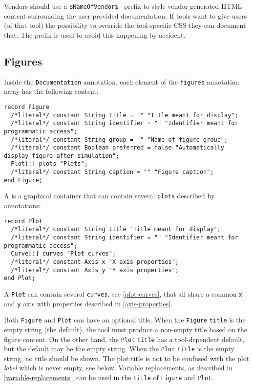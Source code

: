 Vendors should use a \lstinline[language=CSS]!$NameOfVendor$-! prefix to style vendor generated HTML content surrounding the user provided documentation.
If tools want to give users (of that tool) the possibility to override the tool-specific CSS they can document that.
The prefix is used to avoid this happening by accident.

\subsection{Figures}\label{annotations-for-figures}\label{figures}

Inside the \lstinline!Documentation! annotation, each element of the \lstinline!figures! annotation array has the following content:
\begin{lstlisting}[language=modelica]
record Figure
  /*literal*/ constant String title = "" "Title meant for display";
  /*literal*/ constant String identifier = "" "Identifier meant for programmatic access";
  /*literal*/ constant String group = "" "Name of figure group";
  /*literal*/ constant Boolean preferred = false "Automatically display figure after simulation";
  Plot[:] plots "Plots";
  /*literal*/ constant String caption = "" "Figure caption";
end Figure;
\end{lstlisting}

A  is a graphical container that can contain several \lstinline!plots! described by  annotations:
\begin{lstlisting}[language=modelica]
record Plot
  /*literal*/ constant String title "Title meant for display";
  /*literal*/ constant String identifier = "" "Identifier meant for programmatic access";
  Curve[:] curves "Plot curves";
  /*literal*/ constant Axis x "X axis properties";
  /*literal*/ constant Axis y "Y axis properties";
end Plot;
\end{lstlisting}

A \lstinline!Plot! can contain several \lstinline!curves!, see \cref{plot-curves}, that all share a common \lstinline!x! and \lstinline!y! axis with properties described in \cref{axis-properties}.

Both \lstinline!Figure! and \lstinline!Plot! can have an optional title.
When the \lstinline!Figure! \lstinline!title! is the empty string (the default), the tool must produce a non-empty title based on the figure content.
On the other hand, the \lstinline!Plot! \lstinline!title! has a tool-dependent default, but the default may be the empty string.
When the \lstinline!Plot! \lstinline!title! is the empty string, no title should be shown.
The plot title is not to be confused with the plot \emph{label} which is never empty, see below.
Variable replacements, as described in \cref{variable-replacements}, can be used in the \lstinline!title! of \lstinline!Figure! and \lstinline!Plot!.

